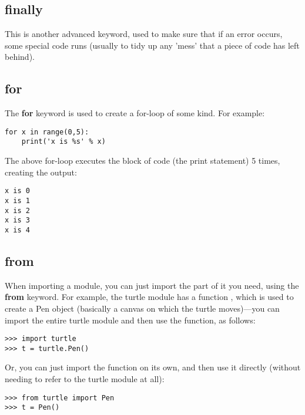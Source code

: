 \subsection*{finally}

This is another advanced keyword, used to make sure that if an error occurs, some special code runs (usually to tidy up any 'mess' that a piece of code has left behind).

\subsection*{for}

The \textbf{for} keyword is used to create a for-loop of some kind. For example:

\begin{Verbatim}[frame=single]
for x in range(0,5):
    print('x is %s' % x)
\end{Verbatim}

\noindent
The above for-loop executes the block of code (the print statement) 5 times, creating the output:

\begin{Verbatim}[frame=single]
x is 0
x is 1
x is 2
x is 3
x is 4
\end{Verbatim}

\subsection*{from}

When importing a module, you can just import the part of it you need, using the \textbf{from} keyword. For example, the turtle module has a function , which is used to create a Pen object (basically a canvas on which the turtle moves)---you can import the entire turtle module and then use the  function, as follows:

\begin{Verbatim}[frame=single]
>>> import turtle
>>> t = turtle.Pen()
\end{Verbatim}

Or, you can just import the  function on its own, and then use it directly (without needing to refer to the turtle module at all):

\begin{Verbatim}[frame=single]
>>> from turtle import Pen
>>> t = Pen()
\end{Verbatim}

